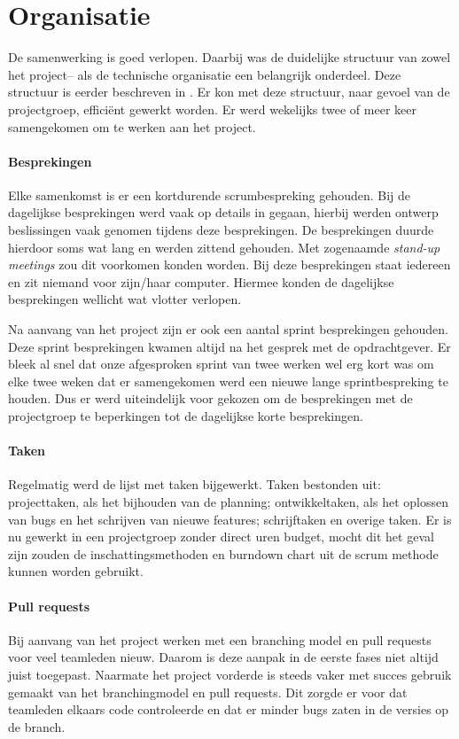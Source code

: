 \section{Organisatie}
De samenwerking is goed verlopen. Daarbij was de duidelijke structuur van zowel het project– als de technische organisatie een belangrijk onderdeel. Deze structuur is eerder beschreven in . Er kon met deze structuur, naar gevoel van de projectgroep, efficiënt gewerkt worden. Er werd wekelijks twee of meer keer samengekomen om te werken aan het project.

\paragraph{Besprekingen} Elke samenkomst is er een kortdurende scrumbespreking gehouden. Bij de dagelijkse besprekingen werd vaak op details in gegaan, hierbij werden ontwerp beslissingen vaak genomen tijdens deze besprekingen. De besprekingen duurde hierdoor soms wat lang en werden zittend gehouden. Met zogenaamde \emph{stand-up meetings} zou dit voorkomen konden worden. Bij deze besprekingen staat iedereen en zit niemand voor zijn/haar computer. Hiermee konden de dagelijkse besprekingen wellicht wat vlotter verlopen.

Na aanvang van het project zijn er ook een aantal sprint besprekingen gehouden. Deze sprint besprekingen kwamen altijd na het gesprek met de opdrachtgever. Er bleek al snel dat onze afgesproken sprint van twee werken wel erg kort was om elke twee weken dat er samengekomen werd een nieuwe lange sprintbespreking te houden. Dus er werd uiteindelijk voor gekozen om de besprekingen met de projectgroep te beperkingen tot de dagelijkse korte besprekingen.

\paragraph{Taken}
Regelmatig werd de lijst met taken bijgewerkt. Taken bestonden uit: projecttaken, als het bijhouden van de planning; ontwikkeltaken, als het oplossen van bugs en het schrijven van nieuwe features; schrijftaken en overige taken. 
Er is nu gewerkt in een projectgroep zonder direct uren budget, mocht dit het geval zijn zouden de inschattingsmethoden en burndown chart uit de scrum methode kunnen worden gebruikt. 

\paragraph{Pull requests}
Bij aanvang van het project werken met een branching model en pull requests voor veel teamleden nieuw. Daarom is deze aanpak in de eerste fases niet altijd juist toegepast. Naarmate het project vorderde is steeds vaker met succes gebruik gemaakt van het branchingmodel en pull requests. Dit zorgde er voor dat teamleden elkaars code controleerde en dat er minder bugs zaten in de versies op de  branch.

